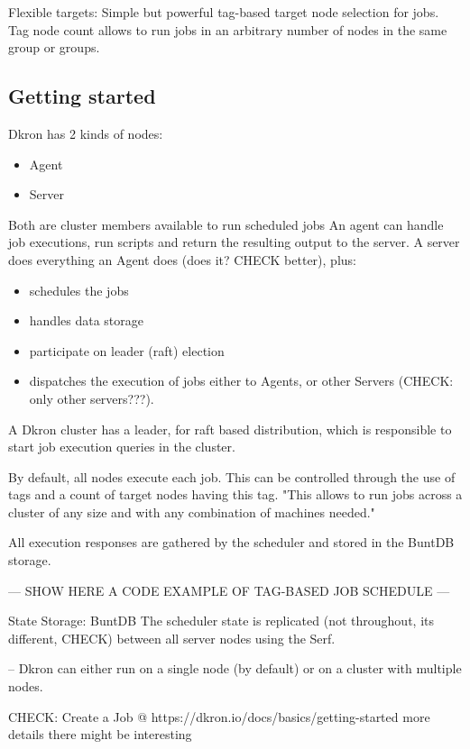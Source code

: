 \documentclass[runningheads]{llncs}
\begin{document}
Flexible targets: Simple but powerful tag-based target node selection for jobs. Tag node count allows to run jobs in an arbitrary number of nodes in the same group or groups.


\subsection{Getting started}
Dkron has 2 kinds of nodes:
\begin{itemize}
    \item Agent
    \item Server
\end{itemize}
Both are cluster members available to run scheduled jobs
An agent can handle job executions, run scripts and return the resulting output to the server.
A server does everything an Agent does (does it? CHECK better), plus:
\begin{itemize}
    \item schedules the jobs
    \item handles data storage
    \item participate on leader (raft) election
    \item dispatches the execution of jobs either to Agents, or other Servers (CHECK: only other servers???).
\end{itemize}

A Dkron cluster has a leader, for raft based distribution, which is responsible to start job execution queries in the cluster.

By default, all nodes execute each job. This can be controlled through the use of tags and
a count of target nodes having this tag. "This allows to run jobs across a cluster of any size and with any
combination of machines needed."

All execution responses are gathered by the scheduler and stored in the BuntDB storage.

--- SHOW HERE A CODE EXAMPLE OF TAG-BASED JOB SCHEDULE ---

State Storage: BuntDB
The scheduler state is replicated (not throughout, its different, CHECK) between all server nodes using the Serf.

--
Dkron can either run on a single node (by default) or on a cluster with multiple nodes.

CHECK: Create a Job @ https://dkron.io/docs/basics/getting-started more details there might be interesting
\end{document}
